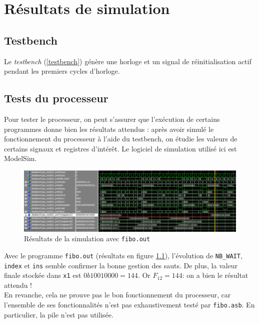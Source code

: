 \chapter{Résultats de simulation}
\label{ch:simulation}

\section{Testbench}

Le \textit{testbench} (\ref{testbench}) génère une horloge et un signal de
réinitialisation actif pendant les premiers cycles d'horloge.



\section{Tests du processeur}

Pour tester le processeur, on peut s'assurer que l'exécution de certains
programmes donne bien les résultats attendus : après avoir simulé le
fonctionnement du processeur à l'aide du testbench, on étudie les valeurs de
certains signaux et registres d'intérêt. Le logiciel de simulation utilisé ici
est ModelSim. \\

\begin{figure}[h]
    \centering
    \includegraphics[width=\textwidth]{figures/simulation.png}
    \caption{Résultats de la simulation avec \texttt{fibo.out}}
    \label{fig:simulation}
\end{figure}

Avec le programme \texttt{fibo.out} (résultats en figure \ref{fig:simulation}),
l'évolution de \texttt{NB\_WAIT}, \texttt{index} et \texttt{ins} semble
confirmer la bonne gestion des sauts. De plus, la valeur finale stockée dans
\texttt{x1} est $0b10010000 = 144$. Or $F_{12} = 144$: on a bien le résultat
attendu ! \\

En revanche, cela ne prouve pas le bon fonctionnement du processeur, car
l'ensemble de ses fonctionnalités n'est pas exhaustivement testé par
\texttt{fibo.asb}. En particulier, la pile n'est pas utilisée.
